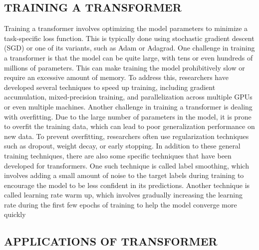 \documentclass[letterpaper, 10pt, conference]{ieeeconf}
\begin{document}
    
    
    \subsection{TRAINING A TRANSFORMER}
    
    Training a transformer involves optimizing the model parameters to minimize a task-specific loss function. This is typically done
    using stochastic gradient descent (SGD) or one of its variants, such as Adam or Adagrad.
    One challenge in training a transformer is that the model can be quite large, with tens or even hundreds of millions of
    parameters. This can make training the model prohibitively slow or require an excessive amount of memory. To address this,
    researchers have developed several techniques to speed up training, including gradient accumulation, mixed-precision training, and
    parallelization across multiple GPUs or even multiple machines.
    Another challenge in training a transformer is dealing with overfitting. Due to the large number of parameters in the
    model, it is prone to overfit the training data, which can lead to poor generalization performance on new data. To prevent
    overfitting, researchers often use regularization techniques such as dropout, weight decay, or early stopping.
    In addition to these general training techniques, there are also some specific techniques that have been developed for
    transformers. One such technique is called label smoothing, which involves adding a small amount of noise to the target labels
    during training to encourage the model to be less confident in its predictions. Another technique is called learning rate warm up,
    which involves gradually increasing the learning rate during the first few epochs of training to help the model converge more
    quickly
    
    
    \subsection{APPLICATIONS OF TRANSFORMER}
    
\end{document}
